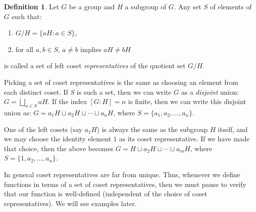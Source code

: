 \documentclass[11pt,oneside]{article}
\theoremstyle{definition}
\newtheorem{defn}[thm]{Definition}
\begin{document}
\begin{defn}
Let $G$ be a group and $H$ a subgroup of $G$. Any set $S$ of elements
of $G$ such that:
\begin{enumerate}
\item $G/H = \{ aH : a \in S \}$, 
\item for all $a,b \in S$, $a \ne b$ implies $aH \ne bH$
\end{enumerate}
is called a set of left coset \emph{representatives} of the quotient
set $G/H$.
\end{defn}


Picking a set of coset representatives is the same as choosing an
element from each distinct coset. If $S$ is such a set, then we can
write $G$ as a \emph{disjoint} union: $G = \bigsqcup_{a \in S} aH$.
If the index $[G:H] = n$ is finite, then we can write this disjoint
union as: $G = a_1H \sqcup a_2H \sqcup \cdots \sqcup a_nH$, where $S =
\{a_1, a_2, \dots, a_n \}$.

One of the left cosets (say $a_1H$) is always the same as the subgroup
$H$ itself, and we may choose the identity element $1$ as its coset
representative. If we have made that choice, then the above becomes $G
= H \sqcup a_2H \sqcup \cdots \sqcup a_mH$, where $S = \{1, a_2,
\dots, a_n \}$. 

In general coset representatives are far from unique. Thus, whenever
we define functions in terms of a set of coset representatives, then
we must pause to verify that our function is well-defined (independent
of the choice of coset representatives). We will see examples later.
\end{document}
